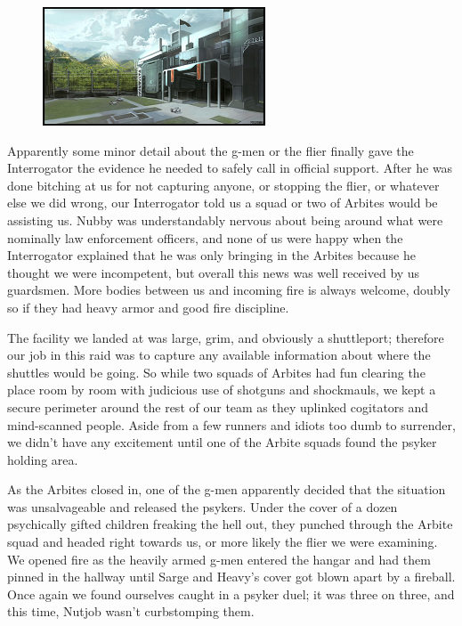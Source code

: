 \begin{figure}
\begin{center}
	\includegraphics[width=\figwidth]{pics/3/15.png}
\end{center}
\end{figure}
Apparently some minor detail about the g-men or the flier finally gave the Interrogator the evidence he needed to safely call in official support. 
After he was done bitching at us for not capturing anyone, or stopping the flier, or whatever else we did wrong, our Interrogator told us a squad or two of Arbites would be assisting us. 
Nubby was understandably nervous about being around what were nominally law enforcement officers, and none of us were happy when the Interrogator explained that he was only bringing in the Arbites because he thought we were incompetent, but overall this news was well received by us guardsmen. 
More bodies between us and incoming fire is always welcome, doubly so if they had heavy armor and good fire discipline.

The facility we landed at was large, grim, and obviously a shuttleport; therefore our job in this raid was to capture any available information about where the shuttles would be going. 
So while two squads of Arbites had fun clearing the place room by room with judicious use of shotguns and shockmauls, we kept a secure perimeter around the rest of our team as they uplinked cogitators and mind-scanned people. 
Aside from a few runners and idiots too dumb to surrender, we didn’t have any excitement until one of the Arbite squads found the psyker holding area.

As the Arbites closed in, one of the g-men apparently decided that the situation was unsalvageable and released the psykers. 
Under the cover of a dozen psychically gifted children freaking the hell out, they punched through the Arbite squad and headed right towards us, or more likely the flier we were examining. 
We opened fire as the heavily armed g-men entered the hangar and had them pinned in the hallway until Sarge and Heavy’s cover got blown apart by a fireball. 
Once again we found ourselves caught in a psyker duel; it was three on three, and this time, Nutjob wasn’t curbstomping them.


